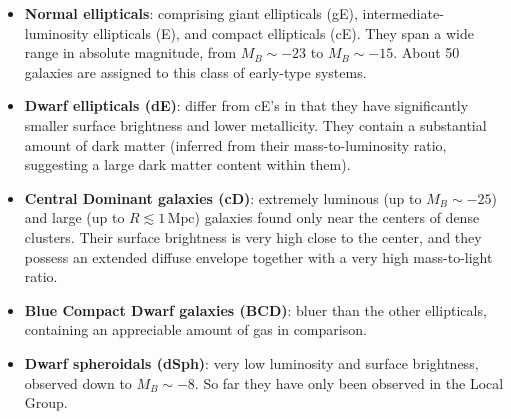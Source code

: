 \begin{itemize}
    \item \textbf{Normal ellipticals}: comprising giant ellipticals (gE), intermediate-luminosity ellipticals (E), and compact ellipticals (cE). They span a wide range in absolute magnitude, from $M_B \sim -23$ to $M_B \sim -15$. About 50 galaxies are assigned to this class of early-type systems.

    \item \textbf{Dwarf ellipticals (dE)}: differ from cE's in that they have significantly smaller surface brightness and lower metallicity. They contain a substantial amount of dark matter (inferred from their mass-to-luminosity ratio, suggesting a large dark matter content within them).

    \item \textbf{Central Dominant galaxies (cD)}: extremely luminous (up to $M_B \sim -25$) and large (up to $R \lesssim 1\,\mathrm{Mpc}$) galaxies found only near the centers of dense clusters. Their surface brightness is very high close to the center, and they possess an extended diffuse envelope together with a very high mass-to-light ratio.

    \item \textbf{Blue Compact Dwarf galaxies (BCD)}: bluer than the other ellipticals, containing an appreciable amount of gas in comparison.

    \item \textbf{Dwarf spheroidals (dSph)}: very low luminosity and surface brightness, observed down to $M_B \sim -8$. So far they have only been observed in the Local Group.
\end{itemize}

\vspace{0.8em}

